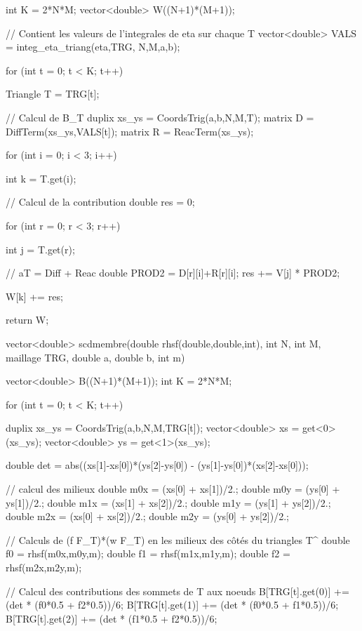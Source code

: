 \begin{codeblock}
{{    int K = 2*N*M;
    vector<double> W((N+1)*(M+1));

    // Contient les valeurs de l'integrales de eta sur chaque T
    vector<double> VALS = integ_eta_triang(eta,TRG, N,M,a,b);

    for (int t = 0; t < K; t++){
        Triangle T = TRG[t];

        // Calcul de B_T
        duplix xs_ys = CoordsTrig(a,b,N,M,T);
        matrix D = DiffTerm(xs_ys,VALS[t]);
        matrix R = ReacTerm(xs_ys);

        for (int i = 0; i < 3; i++){
            int k = T.get(i);

            // Calcul de la contribution
            double res = 0;

            for (int r = 0; r < 3; r++){
                int j = T.get(r);

                // aT = Diff + Reac
                double PROD2 = D[r][i]+R[r][i];
                res += V[j] * PROD2;
            }

            W[k] += res;
        }
    }

    return W;
}



vector<double> scdmembre(double rhsf(double,double,int), int N, int M, maillage TRG,
    double a, double b, int m){

    vector<double> B((N+1)*(M+1));
    int K = 2*N*M;

    for (int t = 0; t < K; t++){

        duplix xs_ys = CoordsTrig(a,b,N,M,TRG[t]);
        vector<double> xs = get<0>(xs_ys);
        vector<double> ys = get<1>(xs_ys);

        double det = abs((xs[1]-xs[0])*(ys[2]-ys[0]) - (ys[1]-ys[0])*(xs[2]-xs[0]));

        // calcul des milieux
        double m0x = (xs[0] + xs[1])/2.;
        double m0y = (ys[0] + ys[1])/2.;
        double m1x = (xs[1] + xs[2])/2.;
        double m1y = (ys[1] + ys[2])/2.;
        double m2x = (xs[0] + xs[2])/2.;
        double m2y = (ys[0] + ys[2])/2.;

        // Calculs de (f \circ F_T)*(w \circ F_T) en les milieux des côtés du triangles T^
        double f0 = rhsf(m0x,m0y,m);
        double f1 = rhsf(m1x,m1y,m);
        double f2 = rhsf(m2x,m2y,m);

        // Calcul des contributions des sommets de T aux noeuds
        B[TRG[t].get(0)] += (det * (f0*0.5 + f2*0.5))/6;
        B[TRG[t].get(1)] += (det * (f0*0.5 + f1*0.5))/6;
        B[TRG[t].get(2)] += (det * (f1*0.5 + f2*0.5))/6;
    }

}}
\end{codeblock}
